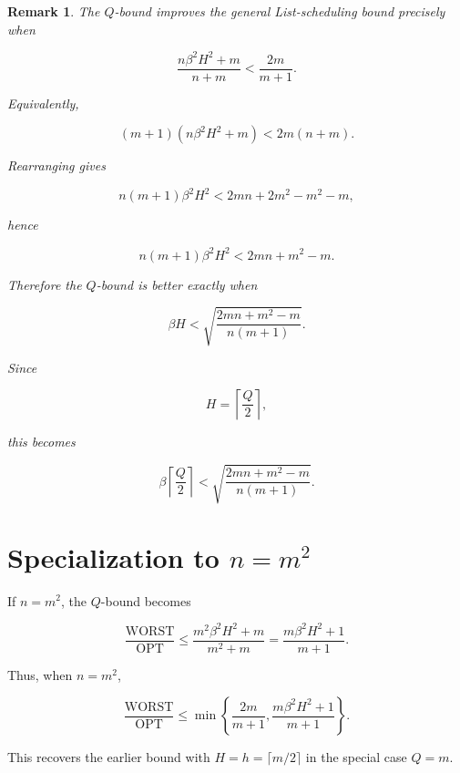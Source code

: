 \documentclass[11pt]{article}
\newtheorem{remark}{Remark}
\newcommand{\OPT}{\mathrm{OPT}}
\newcommand{\WORST}{\mathrm{WORST}}
\begin{document}
\begin{remark}
The \(Q\)-bound improves the general List-scheduling bound precisely when

\[
\frac{n\beta^2H^2+m}{n+m}
<
\frac{2m}{m+1}.
\]

Equivalently,

\[
(m+1)(n\beta^2H^2+m)<2m(n+m).
\]

Rearranging gives

\[
n(m+1)\beta^2H^2
<
2mn+2m^2-m^2-m,
\]

hence

\[
n(m+1)\beta^2H^2
<
2mn+m^2-m.
\]

Therefore the \(Q\)-bound is better exactly when

\[
\beta H
<
\sqrt{
\frac{2mn+m^2-m}{n(m+1)}
}.
\]

Since

\[
H=\left\lceil \frac Q2\right\rceil,
\]

this becomes

\[
\beta \left\lceil \frac Q2\right\rceil
<
\sqrt{
\frac{2mn+m^2-m}{n(m+1)}
}.
\]
\end{remark}

\section{Specialization to \(n=m^2\)}

If \(n=m^2\), the \(Q\)-bound becomes

\[
\frac{\WORST}{\OPT}
\le
\frac{m^2\beta^2H^2+m}{m^2+m}
=
\frac{m\beta^2H^2+1}{m+1}.
\]

Thus, when \(n=m^2\),

\[
\frac{\WORST}{\OPT}
\le
\min\left\{
\frac{2m}{m+1},
\frac{m\beta^2H^2+1}{m+1}
\right\}.
\]

This recovers the earlier bound with \(H=h=\lceil m/2\rceil\) in the special case \(Q=m\).
\end{document}
